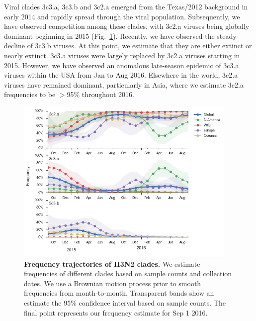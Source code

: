 \documentclass[11pt,oneside,letterpaper]{article}
\begin{document}
\pagebreak

Viral clades 3c3.a, 3c3.b and 3c2.a emerged from the Texas/2012 background in early 2014 and rapidly spread through the viral population. Subsequently, we have observed competition among these clades, with 3c2.a viruses being globally dominant beginning in 2015 (Fig.\ \ref{H3N2_clades}). Recently, we have observed the steady decline of 3c3.b viruses. At this point, we estimate that they are either extinct or nearly extinct. 3c3.a viruses were largely replaced by 3c2.a viruses starting in 2015. However, we have observed an anomalous late-season epidemic of 3c3.a viruses within the USA from Jan to Aug 2016. Elsewhere in the world, 3c2.a viruses have remained dominant, particularly in Asia, where we estimate 3c2.a frequencies to be $>$95\% throughout 2016.

\begin{figure}[H]
	\centering
	\includegraphics[width=0.95\textwidth]{../figures/sep-2016/H3N2_clades.png}
	\caption{\textbf{Frequency trajectories of H3N2 clades.}
	We estimate frequencies of different clades based on sample counts and collection dates.
	We use a Brownian motion process prior to smooth frequencies from month-to-month.
	Transparent bands show an estimate the 95\% confidence interval based on sample counts.
	The final point represents our frequency estimate for Sep 1 2016.
	}
	\label{H3N2_clades}
\end{figure}

\pagebreak
\end{document}
